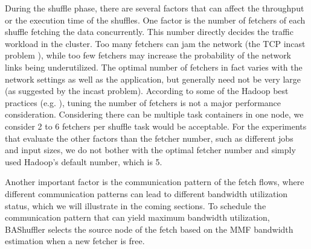 \documentclass[10pt,journal,compsoc]{IEEEtran}
\begin{document}
During the shuffle phase, there are several factors that can
affect the throughput or the execution time of the shuffles.
One factor is the number of fetchers of each shuffle fetching the data
concurrently.
This number directly decides the traffic workload in the cluster. Too many
fetchers can jam the network (the TCP incast problem \cite{Phanishayee:2008:MAT}),
while too few fetchers may increase the probability of the network
links being underutilized. %
The optimal number of fetchers in fact varies with the network settings as well as the application, but generally need not be very large (as suggested by the incast problem). 
According to some of the Hadoop best practices (e.g. \cite{white2015hadoop}), tuning the number of fetchers is not a major performance consideration. 
Considering there can be multiple task containers in one node, we consider 2 to 6 fetchers per shuffle task would be acceptable. 
For the experiments that evaluate the other factors than the fetcher number, such as different jobs and input sizes, we do not bother with the optimal fetcher number and simply used Hadoop's default number, which is 5. 

Another important factor is the communication pattern of the fetch
flows, where different communication patterns can lead to different bandwidth utilization status, which we will illustrate in the coming sections.
To schedule the communication pattern that can yield maximum bandwidth
utilization, BAShuffler selects the source node of the fetch based on the MMF bandwidth estimation
when a new fetcher is free.
\end{document}
